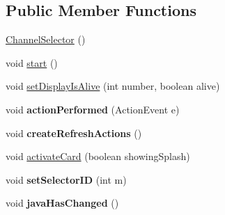 \subsection*{Public Member Functions}
\begin{DoxyCompactItemize}
\item 
\hyperlink{classgov_1_1fnal_1_1ppd_1_1dd_1_1ChannelSelector_a95df49bb45dc325360d7af8ef4a4da22}{Channel\-Selector} ()
\item 
void \hyperlink{classgov_1_1fnal_1_1ppd_1_1dd_1_1ChannelSelector_a9df07ecad4e75132a866bc81169e0df6}{start} ()
\item 
void \hyperlink{classgov_1_1fnal_1_1ppd_1_1dd_1_1ChannelSelector_ab92bc1ecd4b25b8a2a1fed26b57d4d57}{set\-Display\-Is\-Alive} (int number, boolean alive)
\item 
\hypertarget{classgov_1_1fnal_1_1ppd_1_1dd_1_1ChannelSelector_a58d155d92e2b6f64d228cadc3b1039e9}{void {\bfseries action\-Performed} (Action\-Event e)}\label{classgov_1_1fnal_1_1ppd_1_1dd_1_1ChannelSelector_a58d155d92e2b6f64d228cadc3b1039e9}

\item 
\hypertarget{classgov_1_1fnal_1_1ppd_1_1dd_1_1ChannelSelector_a23fbec08667c8708a2a9833005e1edec}{void {\bfseries create\-Refresh\-Actions} ()}\label{classgov_1_1fnal_1_1ppd_1_1dd_1_1ChannelSelector_a23fbec08667c8708a2a9833005e1edec}

\item 
void \hyperlink{classgov_1_1fnal_1_1ppd_1_1dd_1_1ChannelSelector_a637dbc852a236c96841cd5d5492a1079}{activate\-Card} (boolean showing\-Splash)
\item 
\hypertarget{classgov_1_1fnal_1_1ppd_1_1dd_1_1ChannelSelector_a930233587284af74e0533faffc368804}{void {\bfseries set\-Selector\-I\-D} (int m)}\label{classgov_1_1fnal_1_1ppd_1_1dd_1_1ChannelSelector_a930233587284af74e0533faffc368804}

\item 
\hypertarget{classgov_1_1fnal_1_1ppd_1_1dd_1_1ChannelSelector_ad73f42989480ef9af3f5ed0e1f5d364c}{void {\bfseries java\-Has\-Changed} ()}\label{classgov_1_1fnal_1_1ppd_1_1dd_1_1ChannelSelector_ad73f42989480ef9af3f5ed0e1f5d364c}

\end{DoxyCompactItemize}
